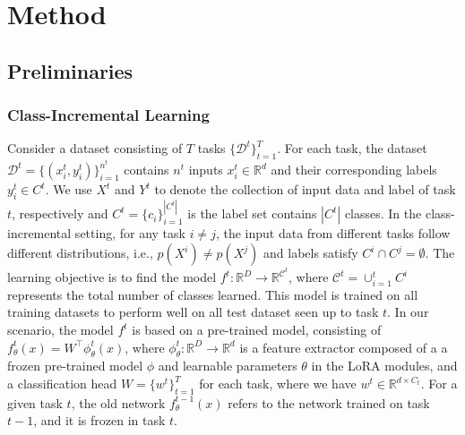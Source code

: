 \section{Method}

\subsection{Preliminaries}
\subsubsection{Class-Incremental Learning}
Consider a dataset consisting of $T$ tasks $\{\mathcal{D}^t\}_{t=1}^T$. For each task, the dataset $\mathcal{D}^t = \{(x_i^t, y_i^t)\}_{i=1}^{n^t}$ contains $n^t$ inputs $x_i^t \in \mathbb{R}^d$ and their corresponding labels $y_i^t \in C^t$. We use $X^t$ and $Y^t$ to denote the collection of input data and label of task $t$, respectively and $C^t =\{c_i\}_{i=1}^{|C^t|}$ is the label set contains 
$|C^t|$ classes. In the class-incremental setting, for any task $i \neq j$, the input data from different tasks follow different distributions, i.e., $p(X^i) \neq p(X^j)$ and labels satisfy $C^i \cap C^j = \emptyset$.
The learning objective is to find the model $f^t: \mathbb{R}^{D} \to \mathbb{R}^{\mathcal{C}^t}$, where $\mathcal{C}^t = \cup_{i=1}^{t}C^i$ 
represents the total number of classes learned. This model is trained on all training datasets to perform well on all test dataset seen up to task $t$. In our scenario, the model $f^t$ is based on a pre-trained model, consisting of $f_{\theta}^t(x) = W^\top \phi_{\theta}^t(x)$, where $\phi_{\theta}^t:\mathbb{R}^D \to \mathbb{R}^d$ is a feature extractor composed of a a frozen pre-trained model $\phi$ and learnable parameters $\theta$ in the LoRA modules, and a classification head $W=\{w^t\}^{T}_{t=1}$ for each task, where we have $w^t \in \mathbb{R}^{d \times C_t}$. For a given task $t$, the old network $f_{\theta}^{t-1}(x)$ refers to the network trained on task $t-1$, and it is frozen in task $t$.
